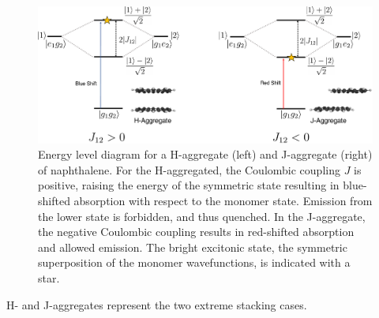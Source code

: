 \begin{figure}[t]
\centering
  \includegraphics[width=\linewidth]{1Intro/H_J_aggregates.pdf}
  \caption[Exciton energy level diagram for H- and J-aggregates]{Energy level diagram for a H-aggregate (left) and J-aggregate (right) of naphthalene. For the H-aggregated, the Coulombic coupling $J$ is positive, raising the energy of the symmetric state resulting in blue-shifted absorption with respect to the monomer state. Emission from the lower state is forbidden, and thus quenched. In the J-aggregate, the negative Coulombic coupling results in red-shifted absorption and allowed emission. The bright excitonic state, the symmetric superposition of the monomer wavefunctions, is indicated with a star.}
  \label{figure: H_J_Aggregates}
\end{figure}

H- and J-aggregates represent the two extreme stacking cases. 

